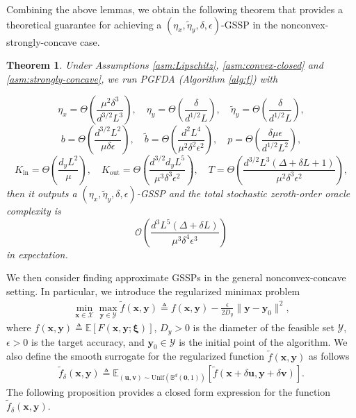 \documentclass[11pt]{article}
\def\vzero{\mathbf{0}}
\def\vu{\mathbf{u}}
\def\vv{\mathbf{v}}
\def\vx{\mathbf{x}}
\def\vy{\mathbf{y}}
\def\vxi{\bm{\xi}}
\def\fO{{\mathcal{O}}}
\def\fX{{\mathcal{X}}}
\def\fY{{\mathcal{Y}}}
\def\BE{{\mathbb{E}}}
\def\BB{{\mathbb{B}}}
\newtheorem{theorem}{Theorem}
\begin{document}
Combining the above lemmas, we obtain the following theorem that provides a theoretical guarantee for achieving a $(\eta_x,\tilde\eta_y,\delta,\epsilon)$-GSSP in the nonconvex-strongly-concave case.

\begin{theorem}\label{zero-thm}
Under Assumptions \ref{asm:Lipschitz}, \ref{asm:convex-closed} and \ref{asm:strongly-concave}, we run PGFDA (Algorithm \ref{alg:f}) with


\[
\eta_x=\Theta\left(\frac{\mu^2\delta^3}{d^{3/2}L^3}\right),
\quad\eta_y=\Theta\left(\frac{\delta}{d^{1/2}L}\right),
\quad\tilde\eta_y=\Theta\left(\frac{\delta}{d^{1/2}L}\right),
\]
\[
 b=\Theta\left(\frac{d^{{3}/{2}}L^2}{\mu\delta\epsilon}\right),\quad  \tilde{b}=\Theta\left(\frac{d^2L^4}{\mu^2\delta^2\epsilon^2}\right),
 \quad p=\Theta\left(\frac{\delta\mu\epsilon}{d^{1/2}L^2}\right),
\]
\[ K_{\mathrm{in}}=\Theta\left(\frac{ d_y L^2}{\mu }\right),\quad
K_{\mathrm{out}}
=
\Theta\left(\frac{d^{3/2}d_y L^5}{\mu^3\delta^3  \epsilon^2}\right),\quad
T=\Theta\left(\frac{d^{3/2}L^3 (\Delta+\delta L+1)}{ \mu^2\delta^3 \epsilon^2} \right),
\]
then it outputs a $(\eta_x,\tilde\eta_y,\delta,\epsilon)$-GSSP 
and the total stochastic zeroth-order oracle complexity is
 \[
 \fO\left(\frac{d^{3}L^5(
 \Delta+\delta L)}{\mu^3 \delta^4 \epsilon^3}\right)
 \]
 in expectation.
\end{theorem}



We then consider finding approximate GSSPs in the general nonconvex-concave setting.
In particular, we introduce the regularized minimax problem
\begin{align}\label{prob:regularized}
    \min_{\vx\in\fX}\max_{\vy\in\fY}\tilde{f}(\vx,\vy) \triangleq f(\vx,\vy)-\frac{\epsilon}{2D_y}\|\vy-\vy_0\|^2,
\end{align}
where $f(\vx,\vy)\triangleq\mathbb{E}[F(\vx,\vy;\vxi)]$, $D_y>0$ is the diameter of the feasible set $\fY$, $\epsilon>0$ is the target accuracy, and $\vy_0\in\fY$ is the initial point of the algorithm.
We also define the smooth surrogate for the regularized function $\tilde{f}(\vx,\vy)$ as follows 
\begin{align}\label{eq:tilde-f-delta} 
    \tilde f_\delta(\vx,\vy) \triangleq \BE_{(\vu,\vv)\sim {\mathrm{Unif}}(\BB ^{d}(\vzero,1))} [\tilde f(\vx+\delta\vu, \vy+\delta\vv)].
\end{align}
The following proposition provides a closed form expression for the function $\tilde f_\delta(\vx,\vy)$.
\end{document}
